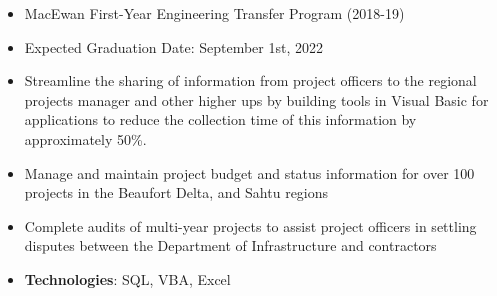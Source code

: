 \documentclass[10pt, letterpaper, ragged2e, withhyper]{altacv}
\begin{document}
\tagline{}

\makecvheader


\begin{paracol}{2}
        \begin{itemize}
            \item MacEwan First-Year Engineering Transfer Program (2018-19)
            \item Expected Graduation Date: September 1st, 2022
        \end{itemize}


            \begin{itemize}
                 \item %
                Streamline the sharing of information from project officers to the regional projects manager and other higher ups by building
                tools in Visual Basic for applications to reduce the collection time of this information by approximately 50\%.
                \item Manage and maintain project budget and status information for over 100 projects in the Beaufort Delta, and Sahtu regions  
                \item Complete audits of multi-year projects to assist project officers in settling disputes between the Department of Infrastructure 
                and contractors 
                \item \textbf{Technologies}: SQL, VBA, Excel 
            \end{itemize}


\end{paracol}
\end{document}
